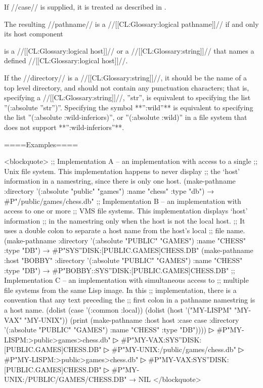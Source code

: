 If //case// is supplied, it is treated as described in \secref\PathnameComponentCase.

The resulting //pathname// is a //[[CL:Glossary:logical pathname]]// if and only its host component

is a //[[CL:Glossary:logical host]]// or a //[[CL:Glossary:string]]// that names a defined //[[CL:Glossary:logical host]]//.

If the //directory// is a //[[CL:Glossary:string]]//, it should be the name of a top level directory, and should not contain any punctuation characters; that is, specifying a //[[CL:Glossary:string]]//, ''str'', is equivalent to specifying the list ''(:absolute ''str'')''. Specifying the symbol **'':wild''** is equivalent to specifying the list ''(:absolute :wild-inferiors)'', or ''(:absolute :wild)'' in a file system that does not support **'':wild-inferiors''**.


====Examples====

<blockquote> ;; Implementation A -- an implementation with access to a single ;; Unix file system. This implementation happens to never display ;; the `host' information in a namestring, since there is only one host. (make-pathname :directory '(:absolute "public" "games") :name "chess" :type "db") → #P"/public/games/chess.db" \medbreak ;; Implementation B -- an implementation with access to one or more ;; VMS file systems. This implementation displays `host' information ;; in the namestring only when the host is not the local host. ;; It uses a double colon to separate a host name from the host's local ;; file name. (make-pathname :directory '(:absolute "PUBLIC" "GAMES") :name "CHESS" :type "DB") → #P"SYS''DISK:[PUBLIC.GAMES]CHESS.DB" (make-pathname :host "BOBBY" :directory '(:absolute "PUBLIC" "GAMES") :name "CHESS" :type "DB") → #P"BOBBY::SYS''DISK:[PUBLIC.GAMES]CHESS.DB" \medbreak ;; Implementation C -- an implementation with simultaneous access to ;; multiple file systems from the same Lisp image. In this ;; implementation, there is a convention that any text preceding the ;; first colon in a pathname namestring is a host name. (dolist (case '(:common :local)) (dolist (host '("MY-LISPM" "MY-VAX" "MY-UNIX")) (print (make-pathname :host host :case case :directory '(:absolute "PUBLIC" "GAMES") :name "CHESS" :type "DB"))))
▷ #P"MY-LISPM:>public>games>chess.db"
▷ #P"MY-VAX:SYS''DISK:[PUBLIC.GAMES]CHESS.DB"
▷ #P"MY-UNIX:/public/games/chess.db"
▷ #P"MY-LISPM:>public>games>chess.db"
▷ #P"MY-VAX:SYS''DISK:[PUBLIC.GAMES]CHESS.DB"
▷ #P"MY-UNIX:/PUBLIC/GAMES/CHESS.DB" → NIL </blockquote>

